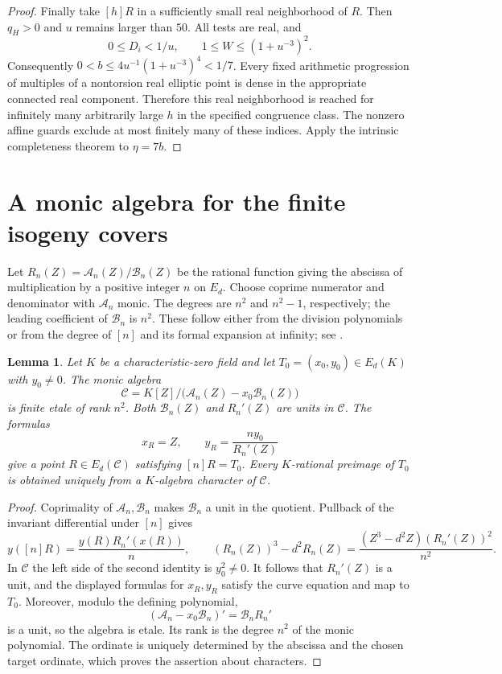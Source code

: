 \documentclass[11pt,a4paper]{article}
\newtheorem{lemma}[theorem]{Lemma}
\begin{document}
\begin{proof}
Finally take $[h]R$ in a sufficiently small real neighborhood
of $R$. Then $q_H>0$ and $u$ remains larger than $50$.
All tests are real, and
\[
       0\le D_i<1/u,\qquad
       1\le W\le(1+u^{-3})^2.
\]
Consequently $0<b\le4u^{-1}(1+u^{-3})^4<1/7$.
Every fixed arithmetic progression of multiples of a nontorsion
real elliptic point is dense in the appropriate connected real
component. Therefore this real neighborhood is reached for
infinitely many arbitrarily large $h$ in the specified congruence
class. The nonzero affine guards exclude at most finitely many
of these indices. Apply the intrinsic completeness theorem to
$\eta=7b$.
\end{proof}

\section{A monic algebra for the finite isogeny covers}

Let $R_n(Z)=\mathcal A_n(Z)/\mathcal B_n(Z)$ be the rational
function giving the abscissa of multiplication by a positive integer
$n$ on $E_d$. Choose coprime numerator and denominator with
$\mathcal A_n$ monic. The degrees are $n^2$ and $n^2-1$,
respectively; the leading coefficient of $\mathcal B_n$ is $n^2$.
These follow either from the division polynomials or from the degree
of $[n]$ and its formal expansion at infinity; see
\cite[Chapter III]{AEC}.

\begin{lemma}\label{lem:isogeny-algebra}
Let $K$ be a characteristic-zero field and let
$T_0=(x_0,y_0)\in E_d(K)$ with $y_0\ne0$. The monic algebra
\[
 \mathcal C=K[Z]/\bigl(\mathcal A_n(Z)-x_0\mathcal B_n(Z)\bigr)
\]
is finite etale of rank $n^2$. Both $\mathcal B_n(Z)$ and
$R_n'(Z)$ are units in $\mathcal C$. The formulas
\[
                  x_R=Z,\qquad y_R=\frac{ny_0}{R_n'(Z)}
\]
give a point $R\in E_d(\mathcal C)$ satisfying $[n]R=T_0$.
Every $K$-rational preimage of $T_0$ is obtained uniquely from
a $K$-algebra character of $\mathcal C$.
\end{lemma}
\begin{proof}
Coprimality of $\mathcal A_n,\mathcal B_n$ makes
$\mathcal B_n$ a unit in the quotient. Pullback of the invariant
differential under $[n]$ gives
\[
 y([n]R)=\frac{y(R)R_n'(x(R))}{n},\qquad
 (R_n(Z))^3-d^2R_n(Z)
     =\frac{(Z^3-d^2Z)(R_n'(Z))^2}{n^2}.
\]
In $\mathcal C$ the left side of the second identity is
$y_0^2\ne0$. It follows that $R_n'(Z)$ is a unit, and the
displayed formulas for $x_R,y_R$ satisfy the curve equation
and map to $T_0$. Moreover, modulo the defining polynomial,
\[
 (\mathcal A_n-x_0\mathcal B_n)'
                         =\mathcal B_n R_n'
\]
is a unit, so the algebra is etale. Its rank is the degree
$n^2$ of the monic polynomial. The ordinate is uniquely
determined by the abscissa and the chosen target ordinate,
which proves the assertion about characters.
\end{proof}
\end{document}

